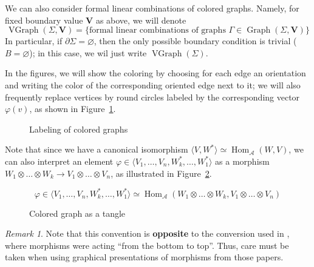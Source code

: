 \documentclass{amsart}
\theoremstyle{definition}
\theoremstyle{remark}
\newtheorem{remark}[theorem]{Remark}
\numberwithin{equation}{section}
\newcommand{\firef}[1]{Figure~{\rm\ref{#1}}}
\newcommand{\del}{\partial}
\newcommand{\<}{\langle}
\renewcommand{\>}{\rangle}
\newcommand{\A}{\mathcal{A}}      %
\newcommand{\VV}{\mathbf{V}}       %
\newcommand{\Ga}{\Gamma}
\newcommand{\ph}{\varphi}
\newcommand{\Si}{\Sigma}
\DeclareMathOperator{\Hom}{Hom}
\DeclareMathOperator{\Gr}{Graph}
\DeclareMathOperator{\VGr}{VGraph}
\begin{document}
We can also consider formal linear combinations of colored graphs. Namely,
for fixed boundary value $\VV$ as above, we will denote 
\begin{equation}\label{e:vgr}
\VGr(\Si,\VV)=\{\text{formal linear combinations of graphs }\Ga\in
\Gr(\Si,\VV)\}
\end{equation}
In particular, if $\del \Si=\varnothing$, then the only possible boundary
condition is trivial ($B=\varnothing$); in this case, we wil just write
$\VGr(\Si)$. 



In the figures, we will show the coloring by choosing for each edge an 
orientation and writing the  color of the corresponding oriented edge next 
to it; we will also frequently  replace vertices by round circles labeled
by the corresponding  vector $\ph(v)$, as shown in \firef{f:coloring}.


\begin{figure}[ht]
\caption{Labeling of colored graphs}\label{f:coloring}
\end{figure}

Note that since we have a canonical isomorphism $ \<V, W^*\>\simeq
\Hom_\A(W,V)$, we can also interpret an element $\ph\in \<V_1,\dots, V_n,
W_k^*, \dots, W_1^*\>$ as a morphism $W_1\otimes\dots \otimes W_k \to
V_1\otimes\dots\otimes V_n$, as illustrated in \firef{f:tangle}.
\begin{figure}[ht]
$$ \ph\in \<V_1,\dots, V_n, W_k^*,\dots, W_1^*\>\simeq 
\Hom_\A(W_1\otimes \dots\otimes W_k, V_1\otimes\dots\otimes V_n)
$$
\caption{Colored graph as a tangle}\label{f:tangle}
\end{figure}
\begin{remark}
Note that this convention is {\bf opposite} to the conversion used in
, where morphisms were acting ``from the bottom
to  top''. Thus, care must be taken when using  graphical presentations of
morphisms  from those papers.  
\end{remark}
\end{document}
